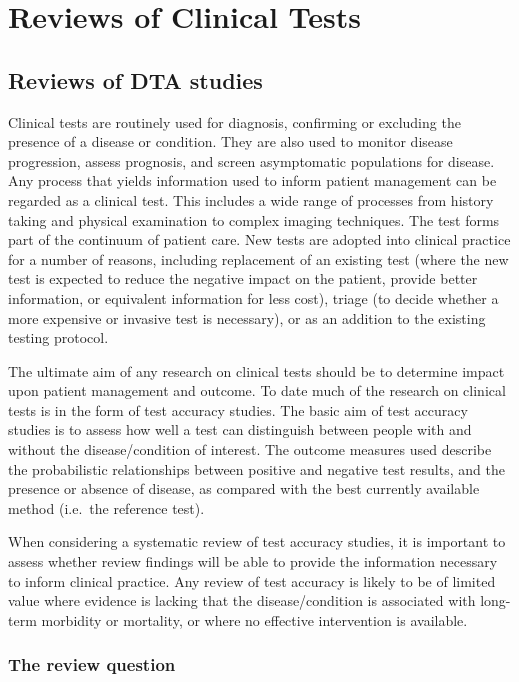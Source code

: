 \documentclass[
  11pt,
  a4paper,
  DIV=11,
  numbers=noendperiod]{scrreprt}
\begin{document}
\part{Reviews of Clinical Tests}

\chapter{Reviews of DTA studies}\label{reviews-of-dta-studies}

Clinical tests are routinely used for diagnosis, confirming or excluding
the presence of a disease or condition. They are also used to monitor
disease progression, assess prognosis, and screen asymptomatic
populations for disease. Any process that yields information used to
inform patient management can be regarded as a clinical test. This
includes a wide range of processes from history taking and physical
examination to complex imaging techniques. The test forms part of the
continuum of patient care. New tests are adopted into clinical practice
for a number of reasons, including replacement of an existing test
(where the new test is expected to reduce the negative impact on the
patient, provide better information, or equivalent information for less
cost), triage (to decide whether a more expensive or invasive test is
necessary), or as an addition to the existing testing protocol.

The ultimate aim of any research on clinical tests should be to
determine impact upon patient management and outcome. To date much of
the research on clinical tests is in the form of test accuracy studies.
The basic aim of test accuracy studies is to assess how well a test can
distinguish between people with and without the disease/condition of
interest. The outcome measures used describe the probabilistic
relationships between positive and negative test results, and the
presence or absence of disease, as compared with the best currently
available method (i.e.~the reference test).

When considering a systematic review of test accuracy studies, it is
important to assess whether review findings will be able to provide the
information necessary to inform clinical practice. Any review of test
accuracy is likely to be of limited value where evidence is lacking that
the disease/condition is associated with long-term morbidity or
mortality, or where no effective intervention is available.

\section{The review question}\label{the-review-question}
\end{document}
